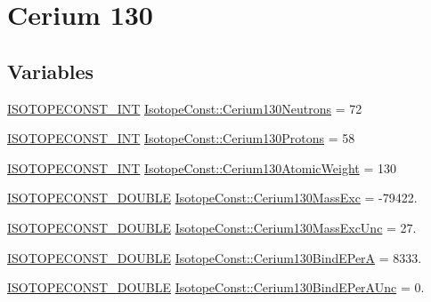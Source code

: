 \hypertarget{group___isotope_const-_cerium-_ce130}{}\section{Cerium 130}
\label{group___isotope_const-_cerium-_ce130}
\subsection*{Variables}
\begin{DoxyCompactItemize}
\item 
\mbox{\hyperlink{group___isotope_const-_macros_ga5f18360b3e99483a35c32d789e62621c}{I\+S\+O\+T\+O\+P\+E\+C\+O\+N\+S\+T\+\_\+\+I\+NT}} \mbox{\hyperlink{group___isotope_const-_cerium-_ce130_gaf988ec04bfa552a71cece6510388ec11}{Isotope\+Const\+::\+Cerium130\+Neutrons}} = 72
\item 
\mbox{\hyperlink{group___isotope_const-_macros_ga5f18360b3e99483a35c32d789e62621c}{I\+S\+O\+T\+O\+P\+E\+C\+O\+N\+S\+T\+\_\+\+I\+NT}} \mbox{\hyperlink{group___isotope_const-_cerium-_ce130_gaf069d3b92900ba4d801c5cabf58e1295}{Isotope\+Const\+::\+Cerium130\+Protons}} = 58
\item 
\mbox{\hyperlink{group___isotope_const-_macros_ga5f18360b3e99483a35c32d789e62621c}{I\+S\+O\+T\+O\+P\+E\+C\+O\+N\+S\+T\+\_\+\+I\+NT}} \mbox{\hyperlink{group___isotope_const-_cerium-_ce130_ga085aa3b74fb824f7d421ff93a359ad42}{Isotope\+Const\+::\+Cerium130\+Atomic\+Weight}} = 130
\item 
\mbox{\hyperlink{group___isotope_const-_macros_ga8f45a7272ce02c0b4c65c44636ed719a}{I\+S\+O\+T\+O\+P\+E\+C\+O\+N\+S\+T\+\_\+\+D\+O\+U\+B\+LE}} \mbox{\hyperlink{group___isotope_const-_cerium-_ce130_gaa217bc91f5dcd581193c3e08c5dfffce}{Isotope\+Const\+::\+Cerium130\+Mass\+Exc}} = -\/79422.
\item 
\mbox{\hyperlink{group___isotope_const-_macros_ga8f45a7272ce02c0b4c65c44636ed719a}{I\+S\+O\+T\+O\+P\+E\+C\+O\+N\+S\+T\+\_\+\+D\+O\+U\+B\+LE}} \mbox{\hyperlink{group___isotope_const-_cerium-_ce130_ga379c0f308b0cbf2293286862aca28aa2}{Isotope\+Const\+::\+Cerium130\+Mass\+Exc\+Unc}} = 27.
\item 
\mbox{\hyperlink{group___isotope_const-_macros_ga8f45a7272ce02c0b4c65c44636ed719a}{I\+S\+O\+T\+O\+P\+E\+C\+O\+N\+S\+T\+\_\+\+D\+O\+U\+B\+LE}} \mbox{\hyperlink{group___isotope_const-_cerium-_ce130_ga9145c57bcd0b85b40423a0f4b6a1ae0e}{Isotope\+Const\+::\+Cerium130\+Bind\+E\+PerA}} = 8333.
\item 
\mbox{\hyperlink{group___isotope_const-_macros_ga8f45a7272ce02c0b4c65c44636ed719a}{I\+S\+O\+T\+O\+P\+E\+C\+O\+N\+S\+T\+\_\+\+D\+O\+U\+B\+LE}} \mbox{\hyperlink{group___isotope_const-_cerium-_ce130_ga0dd7269803fbec33553dea41335f87b1}{Isotope\+Const\+::\+Cerium130\+Bind\+E\+Per\+A\+Unc}} = 0.

\end{DoxyCompactItemize}
